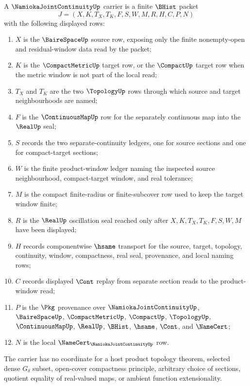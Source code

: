 \begin{definition}
\label{def:namioka-joint-continuity-carrier}
A $\NamiokaJointContinuityUp$ carrier is a finite $\BHist$ packet
$$
J=(X,K,T_X,T_K,F,S,W,M,R,H,C,P,N)
$$
with the following displayed rows:
\begin{enumerate}
\item $X$ is the $\BaireSpaceUp$ source row, exposing only the finite nonempty-open and residual-window data read by the packet;
\item $K$ is the $\CompactMetricUp$ target row, or the $\CompactUp$ target row when the metric window is not part of the local read;
\item $T_X$ and $T_K$ are the two $\TopologyUp$ rows through which source and target neighbourhoods are named;
\item $F$ is the $\ContinuousMapUp$ row for the separately continuous map into the $\RealUp$ seal;
\item $S$ records the two separate-continuity ledgers, one for source sections and one for compact-target sections;
\item $W$ is the finite product-window ledger naming the inspected source neighbourhood, compact-target window, and real tolerance;
\item $M$ is the compact finite-radius or finite-subcover row used to keep the target window finite;
\item $R$ is the $\RealUp$ oscillation seal reached only after $X,K,T_X,T_K,F,S,W,M$ have been displayed;
\item $H$ records componentwise $\hsame$ transport for the source, target, topology, continuity, window, compactness, real seal, provenance, and local naming rows;
\item $C$ records displayed $\Cont$ replay from separate section reads to the product-window read;
\item $P$ is the $\Pkg$ provenance over $\NamiokaJointContinuityUp$, $\BaireSpaceUp$, $\CompactMetricUp$, $\CompactUp$, $\TopologyUp$, $\ContinuousMapUp$, $\RealUp$, $\BHist$, $\hsame$, $\Cont$, and $\NameCert$;
\item $N$ is the local $\NameCert_{\NamiokaJointContinuityUp}$ row.
\end{enumerate}
The carrier has no coordinate for a host product topology theorem, selected dense $G_\delta$ subset, open-cover compactness principle, arbitrary choice of sections, quotient equality of real-valued maps, or ambient function extensionality.
\end{definition}

